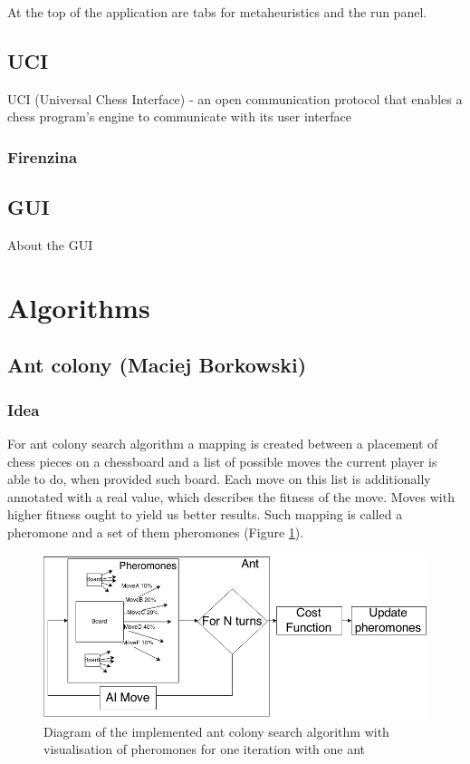 \documentclass[pdftex]{article}
\begin{document}
At the top of the application are tabs for metaheuristics and the run panel.

\subsection{UCI}
\label{sec:uci}
UCI (Universal Chess Interface) - an open communication protocol that enables a chess program's engine to communicate with its user interface
\subsubsection{Firenzina}
\label{sec:firenzina}

\subsection{GUI}
\label{sec:uci}

About the GUI

\section{Algorithms}
\label{sec:project}

\subsection{Ant colony (Maciej Borkowski)}
\label{sec:ant}

\subsubsection{Idea}
For ant colony search algorithm a mapping is created between a placement of chess pieces on a chessboard and a list of possible moves the current player is able to do, when provided such board. Each move on this list is additionally annotated with a real value, which describes the fitness of the move. Moves with higher fitness ought to yield us better results. Such mapping is called a pheromone and a set of them pheromones (Figure \ref{fig:pheromones}).

\begin{figure}[!htb]
	\centering
	\includegraphics[width=1\textwidth]{ant/pheromones.png} 
	\caption{Diagram of the implemented ant colony search algorithm with visualisation of pheromones for one iteration with one ant}
	\label{fig:pheromones}
\end{figure}
\end{document}
